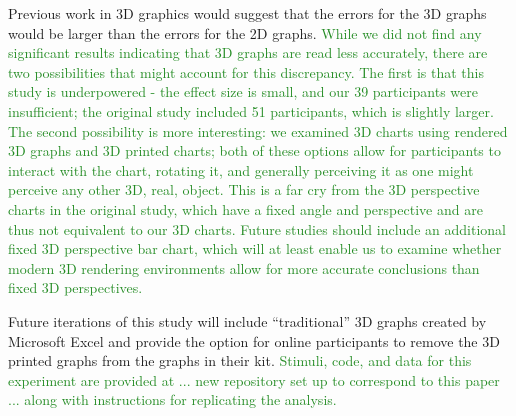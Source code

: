 \documentclass[letterpaper,inpress,dvipsnames]{jdsart}
\begin{document}
Previous work in 3D graphics would suggest that the errors for the 3D graphs would be larger than the errors for the 2D graphs. {\textcolor{ForestGreen}{While we did not find any significant results indicating that 3D graphs are read less accurately, there are two possibilities that might account for this discrepancy. The first is that this study is underpowered - the effect size is small, and our 39 participants were insufficient; the original study included 51 participants, which is slightly larger. The second possibility is more interesting: we examined 3D charts using rendered 3D graphs and 3D printed charts; both of these options allow for participants to interact with the chart, rotating it, and generally perceiving it as one might perceive any other 3D, real, object. This is a far cry from the 3D perspective charts in the original study, which have a fixed angle and perspective and are thus not equivalent to our 3D charts. Future studies should include an additional fixed 3D perspective bar chart, which will at least enable us to examine whether modern 3D rendering environments allow for more accurate conclusions than fixed 3D perspectives.}}

Future iterations of this study will include ``traditional'' 3D graphs created by Microsoft Excel and provide the option for online participants to remove the 3D printed graphs from the graphs in their kit. {\textcolor{ForestGreen}{Stimuli, code, and data for this experiment are provided at ... new repository set up to correspond to this paper ... along with instructions for replicating the analysis.}}



\end{document}
